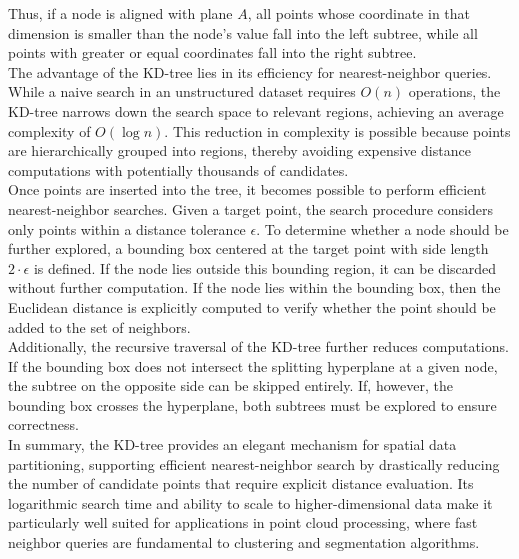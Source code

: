 \noindent Thus, if a node is aligned with plane $A$, all points whose coordinate in that dimension is smaller than the node's value fall 
into the left subtree, while all points with greater or equal coordinates fall into the right subtree.  
\\
The advantage of the KD-tree lies in its efficiency for nearest-neighbor queries. While a naive search in an unstructured dataset 
requires $O(n)$ operations, the KD-tree narrows down the search space to relevant regions, achieving an average complexity of 
$O(\log n)$. This reduction in complexity is possible because points are hierarchically grouped into regions, thereby avoiding 
expensive distance computations with potentially thousands of candidates.  
\\
Once points are inserted into the tree, it becomes possible to perform efficient nearest-neighbor searches. Given a target point, 
the search procedure considers only points within a distance tolerance $\epsilon$. To determine whether a node should be further 
explored, a bounding box centered at the target point with side length $2 \cdot \epsilon$ is defined. If the node lies outside 
this bounding region, it can be discarded without further computation. If the node lies within the bounding box, then the Euclidean 
distance is explicitly computed to verify whether the point should be added to the set of neighbors.  
\\
Additionally, the recursive traversal of the KD-tree further reduces computations. If the bounding box does not intersect the 
splitting hyperplane at a given node, the subtree on the opposite side can be skipped entirely. If, however, the bounding box 
crosses the hyperplane, both subtrees must be explored to ensure correctness.  
\\
In summary, the KD-tree provides an elegant mechanism for spatial data partitioning, supporting efficient nearest-neighbor search 
by drastically reducing the number of candidate points that require explicit distance evaluation. Its logarithmic search time and 
ability to scale to higher-dimensional data make it particularly well suited for applications in point cloud processing, where 
fast neighbor queries are fundamental to clustering and segmentation algorithms.
    
